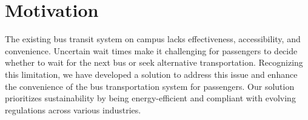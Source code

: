 
\section{Motivation}

The existing bus transit system on campus lacks effectiveness, accessibility, and convenience. Uncertain wait times make it challenging for passengers to decide whether to wait for the next bus or seek alternative transportation. Recognizing this limitation, we have developed a solution to address this issue and enhance the convenience of the bus transportation system for passengers. Our solution prioritizes sustainability by being energy-efficient and compliant with evolving regulations across various industries.
